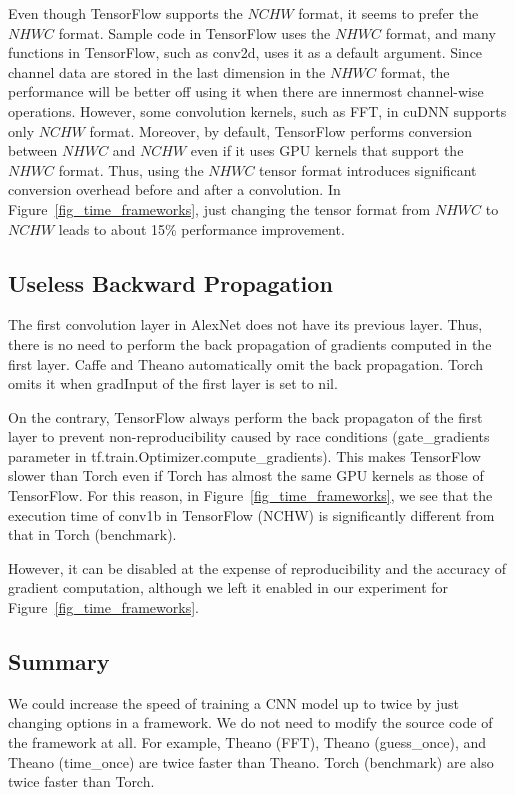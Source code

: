 Even though TensorFlow supports the $NCHW$ format, it seems to prefer the $NHWC$ format. Sample code in TensorFlow uses the $NHWC$ format, and many functions in TensorFlow, such as conv2d, uses it as a default argument. Since channel data are stored in the last dimension in the $NHWC$ format, the performance will be better off using it when there are innermost channel-wise operations. However, some convolution kernels, such as FFT, in cuDNN supports only $NCHW$ format. Moreover, by default, TensorFlow performs conversion between $NHWC$ and $NCHW$ even if it uses GPU kernels that support the $NHWC$ format. Thus, using the $NHWC$ tensor format introduces significant conversion overhead before and after a convolution. In Figure~\ref{fig_time_frameworks}, just changing the tensor format from $NHWC$ to $NCHW$ leads to about 15\% performance improvement. 

\subsection{Useless Backward Propagation}
The first convolution layer in AlexNet does not have its previous layer. Thus, there is no need to perform the back propagation of gradients computed in the first layer. Caffe and Theano automatically omit the back propagation. Torch omits it when \textsf{gradInput} of the first layer is set to nil.

On the contrary, TensorFlow always perform the back propagaton of the first layer to prevent non-reproducibility caused by race conditions (gate\_gradients parameter in tf.train.Optimizer.compute\_gradients). This makes TensorFlow slower than Torch even if Torch has almost the same GPU kernels as those of TensorFlow. For this reason, in Figure~\ref{fig_time_frameworks}, we see that the execution time of \textsf{conv1b} in \textsf{TensorFlow (NCHW)} is significantly different from that in \textsf{Torch (benchmark)}.

However, it can be disabled at the expense of reproducibility and the accuracy of gradient computation, although we left it enabled in our experiment for Figure~\ref{fig_time_frameworks}.

\subsection{Summary}
 We could increase the speed of training a CNN model up to twice by just changing options in a framework. We do not need to modify the source code of the framework at all. For example, \textsf{Theano (FFT)}, \textsf{Theano (guess\_once)}, and \textsf{Theano (time\_once)} are twice faster than \textsf{Theano}. \textsf{Torch (benchmark)} are also twice faster than \textsf{Torch}.

